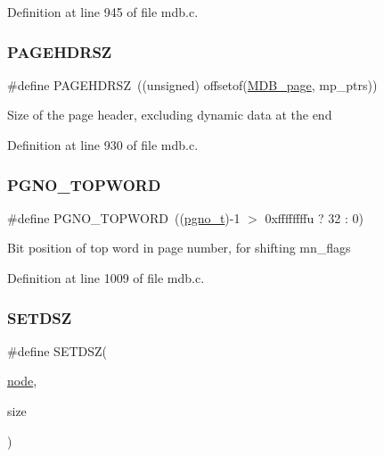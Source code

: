 Definition at line 945 of file mdb.\+c.

\mbox{\label{group__internal_gae25bcf0c0c5c5ead27e82543cbce02e1}} 
\subsubsection{\texorpdfstring{P\+A\+G\+E\+H\+D\+R\+SZ}{PAGEHDRSZ}}
{\footnotesize\ttfamily \#define P\+A\+G\+E\+H\+D\+R\+SZ~((unsigned) offsetof(\mbox{\hyperlink{struct_m_d_b__page}{M\+D\+B\+\_\+page}}, mp\+\_\+ptrs))}

Size of the page header, excluding dynamic data at the end 

Definition at line 930 of file mdb.\+c.

\mbox{\label{group__internal_gac226a942178d95066131a42e50c29d79}} 
\subsubsection{\texorpdfstring{P\+G\+N\+O\+\_\+\+T\+O\+P\+W\+O\+RD}{PGNO\_TOPWORD}}
{\footnotesize\ttfamily \#define P\+G\+N\+O\+\_\+\+T\+O\+P\+W\+O\+RD~((\mbox{\hyperlink{group__internal_gadb65f0424c9d3827bf6409087ad555cd}{pgno\+\_\+t}})-\/1 $>$ 0xffffffffu ? 32 \+: 0)}

Bit position of top word in page number, for shifting mn\+\_\+flags 

Definition at line 1009 of file mdb.\+c.

\mbox{\label{group__internal_ga737db862c118cd893ac8d6a87f6175fe}} 
\subsubsection{\texorpdfstring{S\+E\+T\+D\+SZ}{SETDSZ}}
{\footnotesize\ttfamily \#define S\+E\+T\+D\+SZ(\begin{DoxyParamCaption}\item[{}]{\mbox{\hyperlink{structnode}{node}},  }\item[{}]{size }\end{DoxyParamCaption})}

